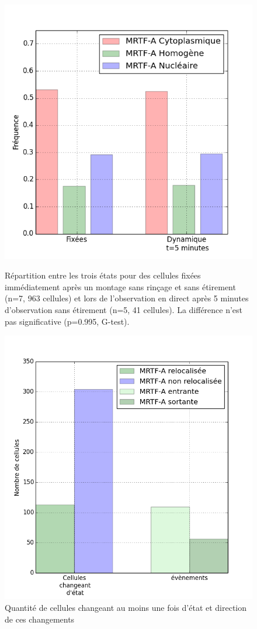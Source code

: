 \begin{figure}
\includegraphics[scale=0.5]{Figures/Reference.png} 
\caption{Répartition entre les trois états pour des cellules fixées immédiatement après un montage sans rinçage et sans étirement (n=7, 963 cellules) et lors de l'observation en direct après 5 minutes d'observation sans étirement (n=5, 41 cellules). La différence n'est pas significative (p=0.995, G-test).
\label{Référence}}
\includegraphics[scale=0.4]{Figures/Reference_transloc.png} 
\caption{Quantité de cellules changeant au moins une fois d'état et direction de ces changements \label{Ref_transloc}}
\end{figure}

